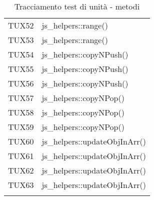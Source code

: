 \documentclass[PianoDiQualifica.tex]{subfiles}
\begin{document}
\begin{longtable}[H]{P{5cm}P{9cm}}
	TUX52 & js\_helpers::range() \\
	TUX53 & js\_helpers::range() \\
	TUX54 & js\_helpers::copyNPush() \\
	TUX55 & js\_helpers::copyNPush() \\
	TUX56 & js\_helpers::copyNPush() \\
	TUX57 & js\_helpers::copyNPop() \\
	TUX58 & js\_helpers::copyNPop() \\
	TUX59 & js\_helpers::copyNPop() \\
	TUX60 & js\_helpers::updateObjInArr() \\
	TUX61 & js\_helpers::updateObjInArr() \\
	TUX62 & js\_helpers::updateObjInArr() \\
	TUX63 & js\_helpers::updateObjInArr() \\
	\hiderowcolors
	\caption{Tracciamento test di unità - metodi}
\end{longtable}
	
\end{document}

